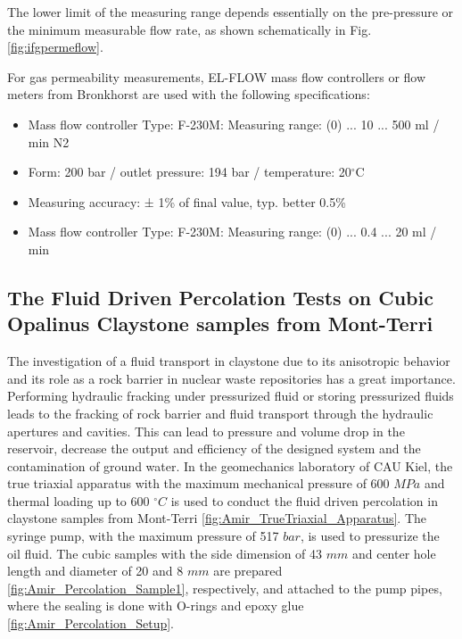 The lower limit of the measuring range depends essentially on the pre-pressure or the minimum measurable flow rate, as shown 
schematically in Fig. \ref{fig:ifgpermeflow}.

For gas permeability measurements, EL-FLOW mass flow controllers or flow meters from Bronkhorst are used with the following specifications:

\begin{itemize}
\item Mass flow controller Type: F-230M: Measuring range: (0) ... 10 ... 500 ml / min N2
\item Form: 200 bar / outlet pressure: 194 bar / temperature: 20$^\circ$C
\item Measuring accuracy: ± 1\% of final value, typ. better 0.5\%
\item Mass flow controller Type: F-230M: Measuring range: (0) ... 0.4 ... 20 ml / min
\end{itemize}



\subsection {The Fluid Driven Percolation Tests on Cubic Opalinus Claystone samples from Mont-Terri}
\label{sec:Percolation_Claystone_Exp}
The investigation of a fluid transport in claystone due to its anisotropic behavior and its role as a rock barrier in nuclear waste repositories has a great importance. Performing hydraulic fracking under pressurized fluid or storing pressurized fluids leads to the fracking of rock barrier and fluid transport through the hydraulic apertures and cavities. This can lead to pressure and volume drop in the reservoir, decrease the output and efficiency of the designed system and the contamination of ground water. In the geomechanics laboratory of CAU Kiel, the true triaxial apparatus with the maximum mechanical pressure of 600 $MPa$ and thermal loading up to 600 $^{\circ}C$ is used to conduct the fluid driven percolation in claystone samples from Mont-Terri \ref{fig:Amir_TrueTriaxial_Apparatus}. The syringe pump, with the maximum pressure of 517 $bar$, is used to pressurize the oil fluid. The cubic samples with the side dimension of 43 $mm$ and center hole length and diameter of 20 and 8 $mm$ are prepared \ref{fig:Amir_Percolation_Sample1}, respectively, and attached to the pump pipes, where the sealing is done with O-rings and epoxy glue \ref{fig:Amir_Percolation_Setup}. 


